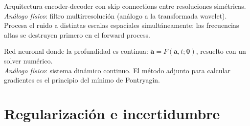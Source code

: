 \begin{description}[leftmargin=0pt, labelwidth=!, labelsep=1em,
  font=\normalfont\bfseries, style=nextline]
\item[U-Net]
Arquitectura encoder-decoder con skip connections entre resoluciones
simétricas.\\
\emph{Análogo físico}: filtro multirresolución (análogo a la transformada
wavelet). Procesa el ruido a distintas escalas espaciales simultáneamente:
las frecuencias altas se destruyen primero en el forward process.

\item[Neural ODE]
Red neuronal donde la profundidad es continua: $\dot{\bm{a}} =
F(\bm{a},t;\bm{\theta})$, resuelto con un solver numérico.\\
\emph{Análogo físico}: sistema dinámico continuo. El método adjunto
para calcular gradientes es el principio del mínimo de Pontryagin.

\end{description}

\section*{Regularización e incertidumbre}

